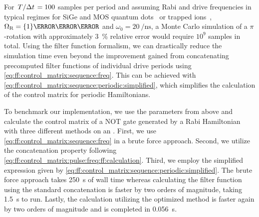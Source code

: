 For $\flatfrac{T}{\Delta t} = 100$ samples per period and assuming Rabi and drive frequencies in typical regimes for SiGe and MOS quantum dots~\cite{Zajac2018,Pla2012} or trapped ions~\cite{Soare2014}, $\Omega_\mr{R} = \qty{1}{\per\micro\second}$ and $\omega_0 = \qty{20}{\per\nano\second}$, a Monte Carlo simulation of a $\pi$-rotation with approximately \qty{3}{\percent} relative error would require $10^9$ samples in total.
Using the filter function formalism, we can drastically reduce the simulation time even beyond the improvement gained from concatenating precomputed filter functions of individual drive periods using \cref{eq:ff:control_matrix:sequence:freq}.
This can be achieved with \cref{eq:ff:control_matrix:sequence:periodic:simplified}, which simplifies the calculation of the control matrix for periodic Hamiltonians.

To benchmark our implementation, we use the parameters from above and calculate the control matrix of a NOT gate generated by a Rabi Hamiltonian with three different methods on an \fastprocessor.
First, we use \cref{eq:ff:control_matrix:sequence:freq} in a brute force approach.
Second, we utilize the concatenation property following \cref{eq:ff:control_matrix:pulse:freq:ff:calculation}.
Third, we employ the simplified expression given by \cref{eq:ff:control_matrix:sequence:periodic:simplified}.
The brute force approach takes \qty{250}{\second} of wall time whereas calculating the filter function using the standard concatenation is faster by two orders of magnitude, taking \qty{1.5}{\second} to run.
Lastly, the calculation utilizing the optimized method is faster again by two orders of magnitude and is completed in \qty{0.056}{\second}.


